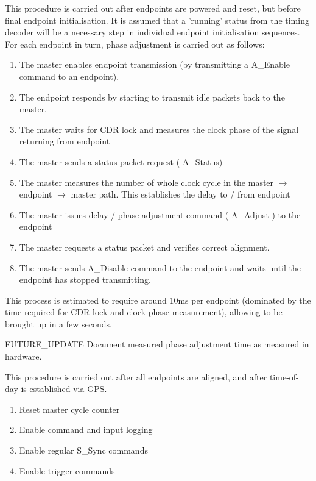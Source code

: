 \documentclass{dune}
\begin{document}

This procedure is carried out after endpoints are powered and reset, but before final endpoint initialisation. It is assumed that a 'running' status from the timing decoder will be a necessary step in individual endpoint initialisation sequences. For each endpoint in turn, phase adjustment is carried out as follows:

\begin{enumerate}
	\item The master enables endpoint transmission (by transmitting a A\_Enable command to an endpoint). 
	\item The endpoint responds by starting to transmit idle packets back to the master.
	\item The master waits for CDR lock and measures the clock phase of the signal returning from endpoint
	\item The master sends a status packet request ( A\_Status)
	\item The master measures the number of whole clock cycle in the master $\rightarrow$ endpoint $\rightarrow$ master path. This establishes the delay to / from endpoint
	\item The master issues delay / phase adjustment command ( A\_Adjust ) to the endpoint
	\item The master requests a status packet and verifies correct alignment.
	\item The master sends A\_Disable command to the endpoint and waits until the endpoint has stopped transmitting.
\end{enumerate}

This process is estimated to require around 10ms per endpoint (dominated by the time required for CDR lock and clock phase measurement), allowing  to be brought up in a few seconds.

{\color{red}FUTURE\_UPDATE} Document measured phase adjustment time as measured in hardware.


This procedure is carried out after all endpoints are aligned, and after time-of-day is established via GPS.

\begin{enumerate}
	\item Reset master cycle counter
	\item Enable command and input logging
	\item Enable regular S\_Sync commands
	\item Enable trigger commands
\end{enumerate}
\end{document}
